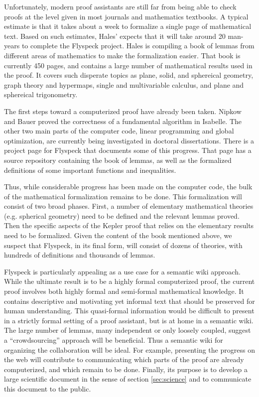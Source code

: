 
  Unfortunately, modern proof assistants are still far from being able to check
proofs at the level given in most journals and mathematics textbooks.  A typical
estimate is that it takes about a week to formalize a single page of mathematical
text.  Based on such estimates, Hales' expects that it will take 
around 20 man-years to complete the Flyspeck project.  
Hales is compiling a book\cite{Hales:2007:FlyspeckBook}
of lemmas from different areas of mathematics to make the formalization easier.    
That book is currently 450 pages, and contains a large number of mathematical
results used in the proof.  It covers such disperate topics
as plane, solid, and sphereical geometry, graph theory and hypermaps, single and
multivariable calculus, and plane and sphereical trigonometry.

The first steps toward a computerized proof have already been taken.
Nipkow and Bauer\cite{Nipkow:2005:Tame} proved the correctness of a
fundamental algorithm in Isabelle.  The other two main parts of the
computer code, linear programming and global optimization, are
currently being investigated in doctoral
dissertations\cite{Zumkeller:2006:TaylorModels,Obua:2005:LinearPrograms}.
There is a project page\cite{website:FlyspeckProjectPage} for Flyspeck
that documents some of this progress.  That page has a source
repository containing the book of lemmas, as well as the formalized
definitions of some important functions and inequalities.  

Thus, while
considerable progress has been made on the computer code, the bulk of
the mathematical formalization remains to be done.  This formalization
will consist of two broad phases.  First, a number of elementary
mathematical theories (e.g. spherical geometry) need to be defined and
the relevant lemmas proved.  Then the specific aspects of the Kepler
proof that relies on the elementary results need to be formalized.
Given the content of the book mentioned above, we suspect that
Flyspeck, in its final form, will consist of dozens of theories, with
hundreds of definitions and thousands of lemmas.

Flyspeck is particularly appealing as a use case for a semantic wiki
approach. While the ultimate result is to be a highly formal
computerized proof, the current proof involves both highly formal and
semi-formal mathematical knowledge.  It contains descriptive and
motivating yet informal text that should be preserved for human
understanding.  This quasi-formal information would be difficult to
present in a strictly formal setting of a proof assistant, but is at
home in a semantic wiki.  The large number of lemmas, many
independent or only loosely coupled, suggest a ``crowdsourcing'' approach will be
beneficial. Thus a semantic wiki for organizing the collaboration
will be ideal.  For example, presenting the progress on the web will
contribute to communicating which parts of the proof are already
computerized, and which remain to be done.  Finally, its purpose is to
develop a large scientific document in the sense of section
\ref{sec:science} and to communicate this document to the public.

